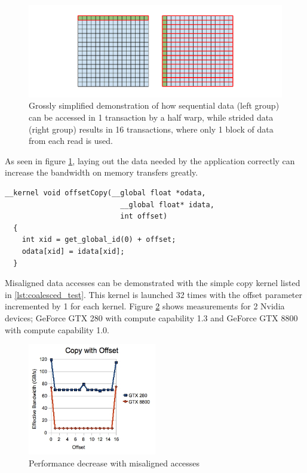 \begin{figure}[h]
  \includegraphics[width=\textwidth]{images/coalesced-access.pdf}
  \caption{Grossly simplified demonstration of how sequential data
    (left group) can be accessed in 1 transaction by a half warp,
    while strided data (right group) results in 16 transactions, where
    only 1 block of data from each read is used.}
  \label{fig:execution-model-figure}
\end{figure}

As seen in figure \ref{fig:execution-model-figure}, laying out the
data needed by the application correctly can increase the bandwidth on
memory transfers greatly.

\begin{lstlisting}[label={lst:coalesced_test}, caption=Copy kernel
  with offset argument]
  __kernel void offsetCopy(__global float *odata,
                           __global float* idata,
                           int offset)
  {
    int xid = get_global_id(0) + offset;
    odata[xid] = idata[xid];
  }
\end{lstlisting}

Misaligned data accesses can be demonstrated with the simple copy
kernel listed in \ref{lst:coalesced_test}. This kernel is launched 32
times with the offset parameter incremented by 1 for each kernel.
Figure \ref{fig:coalesced-performance} shows measurements for 2 Nvidia
devices; GeForce GTX 280 with compute capability 1.3 and GeForce GTX
8800 with compute capability 1.0.

\begin{figure}[h]
  \centering
  \includegraphics[width=0.5\textwidth]{images/coalesced-performance.png}
  \caption{Performance decrease with misaligned accesses}
  \label{fig:coalesced-performance}
\end{figure}

